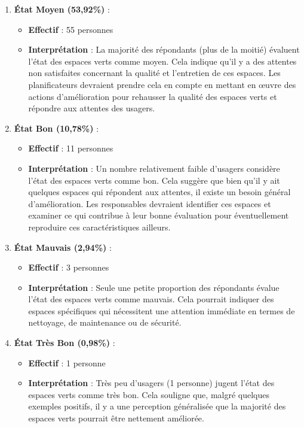 \documentclass[
]{article}
\providecommand{\tightlist}{%
  \setlength{\itemsep}{0pt}\setlength{\parskip}{0pt}}
\begin{document}
\begin{enumerate}
\def\labelenumi{\arabic{enumi}.}
\tightlist
\item
  \textbf{État Moyen (53,92\%)} :

  \begin{itemize}
  \tightlist
  \item
    \textbf{Effectif} : 55 personnes
  \item
    \textbf{Interprétation} : La majorité des répondants (plus de la
    moitié) évaluent l'état des espaces verts comme moyen. Cela indique
    qu'il y a des attentes non satisfaites concernant la qualité et
    l'entretien de ces espaces. Les planificateurs devraient prendre
    cela en compte en mettant en œuvre des actions d'amélioration pour
    rehausser la qualité des espaces verts et répondre aux attentes des
    usagers.
  \end{itemize}
\item
  \textbf{État Bon (10,78\%)} :

  \begin{itemize}
  \tightlist
  \item
    \textbf{Effectif} : 11 personnes
  \item
    \textbf{Interprétation} : Un nombre relativement faible d'usagers
    considère l'état des espaces verts comme bon. Cela suggère que bien
    qu'il y ait quelques espaces qui répondent aux attentes, il existe
    un besoin général d'amélioration. Les responsables devraient
    identifier ces espaces et examiner ce qui contribue à leur bonne
    évaluation pour éventuellement reproduire ces caractéristiques
    ailleurs.
  \end{itemize}
\item
  \textbf{État Mauvais (2,94\%)} :

  \begin{itemize}
  \tightlist
  \item
    \textbf{Effectif} : 3 personnes
  \item
    \textbf{Interprétation} : Seule une petite proportion des répondants
    évalue l'état des espaces verts comme mauvais. Cela pourrait
    indiquer des espaces spécifiques qui nécessitent une attention
    immédiate en termes de nettoyage, de maintenance ou de sécurité.
  \end{itemize}
\item
  \textbf{État Très Bon (0,98\%)} :

  \begin{itemize}
  \tightlist
  \item
    \textbf{Effectif} : 1 personne
  \item
    \textbf{Interprétation} : Très peu d'usagers (1 personne) jugent
    l'état des espaces verts comme très bon. Cela souligne que, malgré
    quelques exemples positifs, il y a une perception généralisée que la
    majorité des espaces verts pourrait être nettement améliorée.
  \end{itemize}
\end{enumerate}
\end{document}
